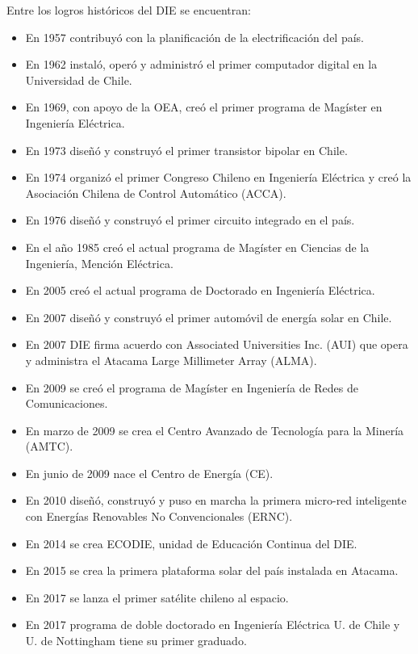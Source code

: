 Entre los logros históricos del DIE se encuentran:
\begin{itemize}
\item En 1957 contribuyó con la planificación de la electrificación del país.
\item En 1962 instaló, operó y administró el primer computador digital en la Universidad de Chile.
\item En 1969, con apoyo de la OEA, creó el primer programa de Magíster en Ingeniería Eléctrica.
\item En 1973 diseñó y construyó el primer transistor bipolar en Chile.
\item En 1974 organizó el primer Congreso Chileno en Ingeniería Eléctrica y creó la Asociación Chilena de Control Automático (ACCA).
\item En 1976 diseñó y construyó el primer circuito integrado en el país.
\item En el año 1985 creó el actual programa de Magíster en Ciencias de la Ingeniería, Mención Eléctrica.
\item En 2005 creó el actual programa de Doctorado en Ingeniería Eléctrica.
\item En 2007 diseñó y construyó el primer automóvil de energía solar en Chile.
\item En 2007 DIE firma acuerdo con Associated Universities Inc. (AUI) que opera y administra el Atacama Large Millimeter Array (ALMA).
\item En 2009 se creó el programa de Magíster en Ingeniería de Redes de Comunicaciones. 
\item En marzo de 2009 se crea el Centro Avanzado de Tecnología para la Minería (AMTC).
\item En junio de 2009 nace el Centro de Energía (CE).
\item En 2010 diseñó, construyó y puso en marcha la primera micro-red inteligente con Energías Renovables No Convencionales (ERNC).
\item En 2014 se crea ECODIE, unidad de Educación Continua del DIE.
\item En 2015 se crea la primera plataforma solar del país instalada en Atacama.
\item En 2017 se lanza el primer satélite chileno al espacio.
\item En 2017 programa de doble doctorado en Ingeniería Eléctrica U. de Chile y U. de Nottingham tiene su primer graduado.

\end{itemize}

